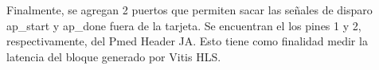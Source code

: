 \documentclass[conference]{IEEEtran}
\begin{document}
Finalmente, se agregan 2 puertos que permiten sacar las señales de disparo ap\_start y ap\_done fuera de la tarjeta. Se encuentran el los pines 1 y 2, respectivamente, del Pmed Header JA. Esto tiene como finalidad medir la latencia del bloque generado por Vitis HLS.


\end{document}
